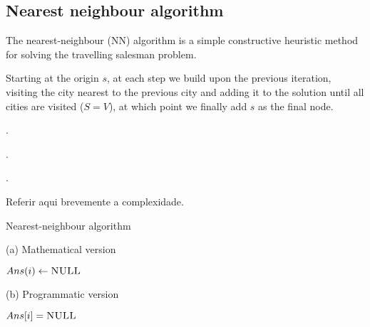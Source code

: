 \subsection{Nearest neighbour algorithm} \label{algorithm-tsp-nn}
The nearest-neighbour (NN) algorithm is a simple constructive heuristic method for solving the travelling salesman problem.\par
Starting at the origin $s$, at each step we build upon the previous iteration, visiting the city nearest to the previous city and adding it to the solution until all cities are visited ($S = V$), at which point we finally add $s$ as the final node.\par
\par.\par.\par.\par Referir aqui brevemente a complexidade.
\vspace{-1em}
\begin{algorithm}[ht]
    \caption{Nearest-neighbour algorithm}
    \label{alg:nearest neighbour}
    \begin{minipage}[t]{0.49\linewidth}
        (a) Mathematical version
        \begin{algorithmic}[1]
                 {$Ans(i) \gets \textsc{NULL}$}
                \EndFor
                \EndFor
                \State {}
            \EndFunction
        \end{algorithmic}
    \end{minipage}
    \begin{minipage}[t]{0.49\linewidth}
        (b) Programmatic version
        \begin{algorithmic}[1]
                 {$Ans[i] = \textsc{NULL}$}
                \EndFor
                        \EndIf
                    \EndFor
                \EndFor
                \State {}
            \EndFunction
        \end{algorithmic}
    \end{minipage}
\end{algorithm}


